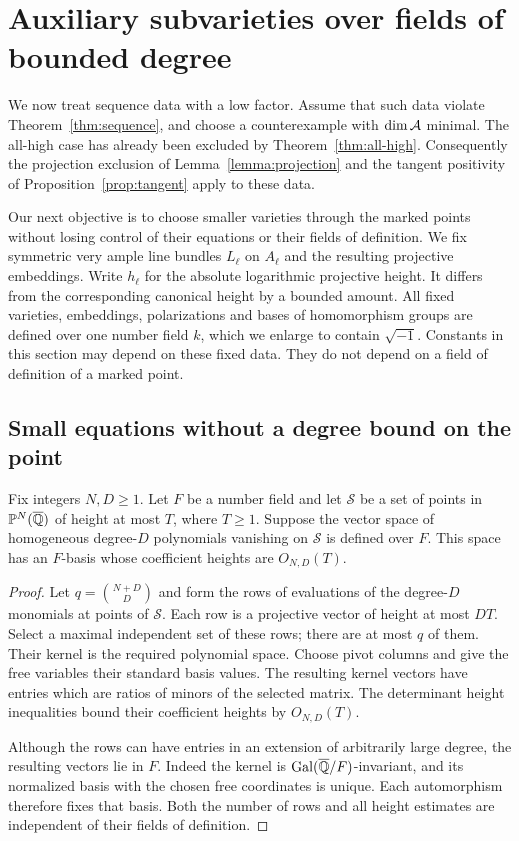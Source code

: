 \section{Auxiliary subvarieties over fields of bounded degree}
\label{sec:minimal}

We now treat sequence data with a low factor.  Assume that such data violate
Theorem~\ref{thm:sequence}, and choose a counterexample with
$\dim\mathcal A$ minimal.  The all-high case has already been excluded by
Theorem~\ref{thm:all-high}.  Consequently the projection exclusion of
Lemma~\ref{lemma:projection} and the tangent positivity of
Proposition~\ref{prop:tangent} apply to these data.

Our next objective is to choose smaller varieties through the marked points
without losing control of their equations or their fields of definition.
We fix symmetric very ample line bundles $L_\ell$ on $A_\ell$ and the
resulting projective embeddings.  Write $h_\ell$ for the absolute logarithmic
projective height.  It differs from the corresponding canonical height by
a bounded amount.  All fixed varieties, embeddings, polarizations and bases
of homomorphism groups are defined over one number field $k$, which we
enlarge to contain $\sqrt{-1}$.  Constants in this section may depend on
these fixed data.  They do not depend on a field of definition of a marked
point.

\subsection{Small equations without a degree bound on the point}

\begin{lemma}\label{lemma:height-kernel}
Fix integers $N,D\geq 1$.  Let $F$ be a number field and let $\mathcal S$ be
a set of points in $\mathbb P^N(\overline{\mathbb Q})$ of height at most $T$, where $T\geq1$.
Suppose the vector space of homogeneous degree-$D$ polynomials vanishing
on $\mathcal S$ is defined over $F$.  This space has an $F$-basis whose
coefficient heights are $O_{N,D}(T)$.
\end{lemma}

\begin{proof}
Let $q=\binom{N+D}{D}$ and form the rows of evaluations of the degree-$D$
monomials at points of $\mathcal S$.  Each row is a projective vector of
height at most $DT$.  Select a maximal independent set of these rows;
there are at most $q$ of them.  Their kernel is the required polynomial
space.  Choose pivot columns and give the free variables their standard
basis values.  The resulting kernel vectors have entries which are ratios
of minors of the selected matrix.  The determinant height inequalities
bound their coefficient heights by $O_{N,D}(T)$.

Although the rows can have entries in an extension of arbitrarily large
degree, the resulting vectors lie in $F$.  Indeed the kernel is
$\operatorname{Gal}(\overline{\mathbb Q}/F)$-invariant, and its normalized basis with the
chosen free coordinates is unique.  Each automorphism therefore fixes
that basis.  Both the number of rows and all height estimates are
independent of their fields of definition.
\end{proof}

